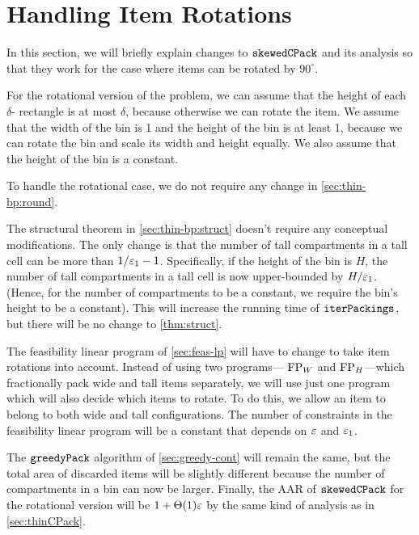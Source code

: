 \section{Handling Item Rotations}
\label{sec:thin-bp:rot}

In this section, we will briefly explain changes to $\operatorname{\mathtt{skewedCPack}}$ and its analysis
so that they work for the case where items can be rotated by $90^{\circ}$.

For the rotational version of the problem, we can assume \wLoG{} that
the height of each $\delta$-\thin{} rectangle is at most $\delta$,
because otherwise we can rotate the item.
We assume \wLoG{} that the width of the bin is 1
and the height of the bin is at least 1,
because we can rotate the bin and scale its width and height equally.
We also assume that the height of the bin is a constant.

To handle the rotational case, we do not require any change in \cref{sec:thin-bp:round}.

The structural theorem in \cref{sec:thin-bp:struct} doesn't require any
conceptual modifications. The only change is that the number of tall compartments
in a tall cell can be more than $1/\varepsilon_1-1$.
Specifically, if the height of the bin is $H$, the number of tall compartments
in a tall cell is now upper-bounded by $H/\varepsilon_1$.
(Hence, for the number of compartments to be a constant,
we require the bin's height to be a constant).
This will increase the running time of $\operatorname{\mathtt{iterPackings}}$,
but there will be no change to \cref{thm:struct}.

The feasibility linear program of \cref{sec:feas-lp} will have to change
to take item rotations into account. Instead of using two programs---%
$\operatorname{FP}_W$ and $\operatorname{FP}_H$---which fractionally pack wide and tall items separately,
we will use just one program which will also decide which items to rotate.
To do this, we allow an item to belong to both wide and tall configurations.
The number of constraints in the feasibility linear program will
be a constant that depends on $\varepsilon$ and $\varepsilon_1$.

The $\operatorname{\mathtt{greedyPack}}$ algorithm of \cref{sec:greedy-cont} will remain the same,
but the total area of discarded items will be slightly different because
the number of compartments in a bin can now be larger.
Finally, the AAR of $\operatorname{\mathtt{skewedCPack}}$ for the rotational version will be $1 + \Theta(1)\varepsilon$
by the same kind of analysis as in \cref{sec:thinCPack}.
